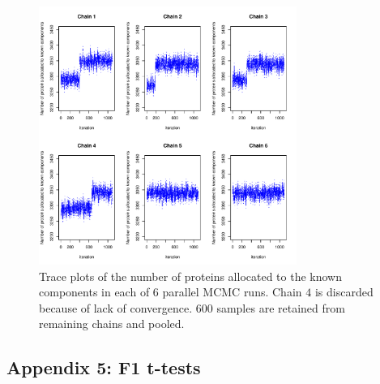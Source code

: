 \documentclass[12pt,english]{article}\usepackage[]{graphicx}\usepackage[]{color}
\newenvironment{knitrout}{}{} %
\begin{document}
\begin{figure}[ht]
  \centering
\begin{knitrout}
\color{fgcolor}
\includegraphics[width=0.75\textwidth]{figure/traceplots-1} 

\end{knitrout}
\caption{Trace plots of the number of proteins allocated to the known
  components in each of 6 parallel MCMC runs. Chain $4$ is discarded
  because of lack of convergence. $600$ samples are retained from
  remaining chains and pooled.}
  \label{figure::mcmcchains}
\end{figure}


\clearpage

\subsection{Appendix 5: F1 t-tests}\label{app::ttestf1}
\end{document}
